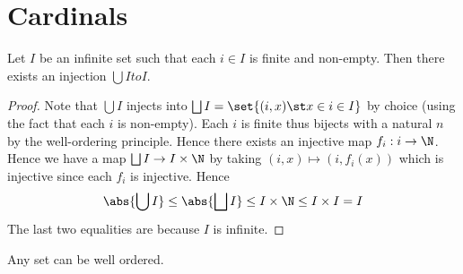 \section{Cardinals}



\begin{lem}
    Let $I$ be an infinite set such that each $i \in I$ is finite and 
    non-empty.
    Then there exists an injection $\bigcup I to I$.
\end{lem}
\begin{proof}
    Note that $\bigcup I$ injects into 
    $\bigsqcup I = \set{(i,x) \st x \in i \in I}$ by choice 
    (using the fact that each $i$ is non-empty).
    Each $i$ is finite thus bijects with a natural $n$ 
    by the well-ordering principle.
    Hence there exists an injective map $f_i : i \to \N$.
    Hence we have a map $\bigsqcup I \to I \times \N$ by taking 
    $(i,x) \mapsto (i,f_i(x))$ which is injective since each $f_i$ is injective.
    Hence 
    \[\abs{\bigcup I} \leq \abs{\bigsqcup I} \leq I \times \N \leq 
    I \times I = I\]
    The last two equalities are because $I$ is infinite.
  \end{proof}

\begin{lem}
  Any set can be well ordered.
\end{lem}
